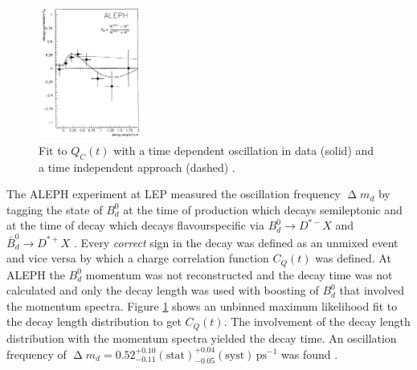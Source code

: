 \begin{figure}
    \centering
    \includegraphics[width=0.3\textwidth]{figs/ALEPHresults.png}
    \caption{Fit to $Q_C(t)$ with a time dependent oscillation in data (solid) and a time independent approach (dashed) \cite{1993498}.}
    \label{fig:ALEPHresults}
\end{figure}
The ALEPH experiment at LEP measured the oscillation frequency $\upDelta m_d$ by tagging the state of $B_d^0$ at the time of production which decays semileptonic and at the time of decay which decays flavourspecific via $B_d^0\rightarrow D^{*-}X$ and $\bar B_d^0\rightarrow D^{*+}X$ \cite{1993498}.
Every \textit{correct} sign in the decay was defined as an unmixed event and vice versa by which a charge correlation function $C_Q(t)$ was defined.
At ALEPH the $B_d^0$ momentum was not reconstructed and the decay time was not calculated and only the decay length was used with boosting of $B_d^0$ that involved the momentum spectra.
Figure \ref{fig:ALEPHresults} shows an unbinned maximum likelihood fit to the decay length distribution to get $C_Q(t)$.
The involvement of the decay length distribution with the momentum spectra yielded the decay time.
An oscillation frequency of $\upDelta m_d = 0.52^{+0.10}_{-0.11}(\text{stat})^{+0.04}_{-0.05}(\text{syst})\, \text{ps}^{-1}$ was found \cite{1993498}.

